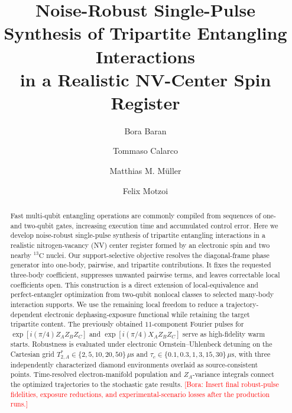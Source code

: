 \documentclass[
  aps,
  pra,
  reprint,            %
  superscriptaddress, %
  amsmath,amssymb,
  notitlepage
]{revtex4-2}
\newcommand{\bb}[1]{\textcolor{red}{[Bora: #1]}}
\begin{document}
\author{Bora Baran}

\author{Tommaso Calarco}

\author{Matthias M. Müller}

\author{Felix Motzoi}


\title{Noise-Robust Single-Pulse Synthesis of Tripartite Entangling Interactions\\
in a Realistic NV-Center Spin Register}

\begin{abstract}
\noindent
Fast multi-qubit entangling operations are commonly compiled from sequences of one- and two-qubit gates, increasing execution time and accumulated control error. Here we develop noise-robust single-pulse synthesis of tripartite entangling interactions in a realistic nitrogen-vacancy (NV) center register formed by an electronic spin and two nearby $^{13}\mathrm C$ nuclei. Our support-selective objective resolves the diagonal-frame phase generator into one-body, pairwise, and tripartite contributions. It fixes the requested three-body coefficient, suppresses unwanted pairwise terms, and leaves correctable local coefficients open. This construction is a direct extension of local-equivalence and perfect-entangler optimization from two-qubit nonlocal classes to selected many-body interaction supports. We use the remaining local freedom to reduce a trajectory-dependent electronic dephasing-exposure functional while retaining the target tripartite content. The previously obtained $11$-component Fourier pulses for $\exp[i(\pi/4)Z_AZ_BZ_C]$ and $\exp[i(\pi/4)X_AZ_BZ_C]$ serve as high-fidelity warm starts. Robustness is evaluated under electronic Ornstein--Uhlenbeck detuning on the Cartesian grid $T_{2,A}^{\ast}\in\{2,5,10,20,50\}\,\mu\mathrm{s}$ and $\tau_c\in\{0.1,0.3,1,3,15,30\}\,\mu\mathrm{s}$, with three independently characterized diamond environments overlaid as source-consistent points. Time-resolved electron-manifold population and $Z_A$-variance integrals connect the optimized trajectories to the stochastic gate results. \bb{Insert final robust-pulse fidelities, exposure reductions, and experimental-scenario losses after the production runs.}
\end{abstract}
\end{document}
